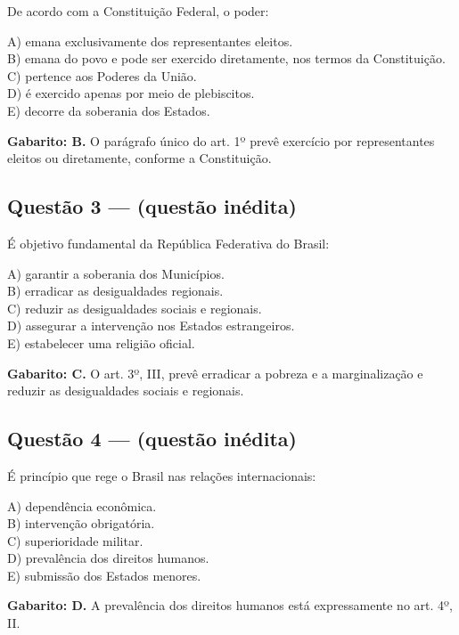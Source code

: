 \documentclass[11pt,a4paper]{article}
\begin{document}
De acordo com a Constituição Federal, o poder:

A) emana exclusivamente dos representantes eleitos. \\ B) emana do povo e pode ser exercido diretamente, nos termos da Constituição. \\ C) pertence aos Poderes da União. \\ D) é exercido apenas por meio de plebiscitos. \\ E) decorre da soberania dos Estados.

\begin{alerta}
\textbf{Gabarito: B.} O parágrafo único do art. 1º prevê exercício por representantes eleitos ou diretamente, conforme a Constituição.
\end{alerta}

\subsection*{Questão 3 — (questão inédita)}

É objetivo fundamental da República Federativa do Brasil:

A) garantir a soberania dos Municípios. \\ B) erradicar as desigualdades regionais. \\ C) reduzir as desigualdades sociais e regionais. \\ D) assegurar a intervenção nos Estados estrangeiros. \\ E) estabelecer uma religião oficial.

\begin{alerta}
\textbf{Gabarito: C.} O art. 3º, III, prevê erradicar a pobreza e a marginalização e reduzir as desigualdades sociais e regionais.
\end{alerta}

\subsection*{Questão 4 — (questão inédita)}

É princípio que rege o Brasil nas relações internacionais:

A) dependência econômica. \\ B) intervenção obrigatória. \\ C) superioridade militar. \\ D) prevalência dos direitos humanos. \\ E) submissão dos Estados menores.

\begin{alerta}
\textbf{Gabarito: D.} A prevalência dos direitos humanos está expressamente no art. 4º, II.
\end{alerta}
\end{document}
